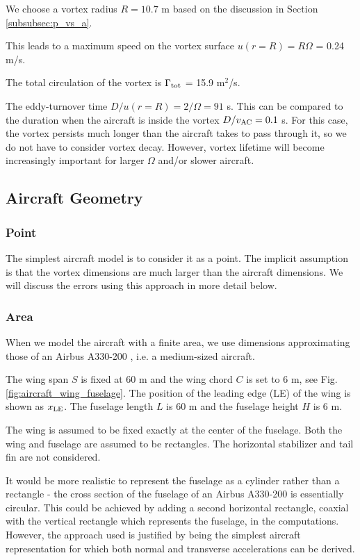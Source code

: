 \documentclass[smallextended]{svjour3}       %
\begin{document}
We choose a vortex radius $R = 10.7$ m based on the discussion in Section \ref{subsubsec:p_vs_a}.

This leads to a maximum speed on the vortex surface $u(r=R) = R \Omega$ = 0.24 m/s.

The total circulation of the vortex is $\Gamma_{\rm tot}$ = 15.9 m$^2$/s.

The eddy-turnover time $D/u(r=R)=2/\Omega= 91$ s. This can be compared to the duration when the aircraft is inside the vortex $D/v_{\rm AC} = 0.1 $ s. For this case, the vortex persists much longer than the aircraft takes to pass through it, so we do not have to consider vortex decay. However, vortex lifetime will become increasingly important for larger $\Omega$ and/or slower aircraft.

\subsection{Aircraft Geometry}

\subsubsection{Point}

The simplest aircraft model is to consider it as a point. The implicit assumption is that the vortex dimensions are much larger than the aircraft dimensions. We will discuss the errors using this approach in more detail below.

\subsubsection{Area}

When we model the aircraft with a finite area, we use dimensions approximating those of an Airbus A330-200 \citep{airbus_a}, i.e. a medium-sized aircraft.

The wing span $S$ is fixed at 60 m and the wing chord $C$ is set to 6 m, see Fig. \ref{fig:aircraft_wing_fuselage}. The position of the leading edge (LE) of the wing is shown as $x_{\rm LE}$. The fuselage length $L$ is 60 m and the fuselage height $H$ is 6 m.

The wing is assumed to be fixed exactly at the center of the fuselage. Both the wing and fuselage are assumed to be rectangles. The horizontal stabilizer and tail fin are not considered.

It would be more realistic to represent the fuselage as a cylinder rather than a rectangle - the cross section of the fuselage of an Airbus A330-200 is essentially circular. This could be achieved by adding a second horizontal rectangle, coaxial with the vertical rectangle which represents the fuselage, in the computations. However, the approach used is justified by being the simplest aircraft representation for which both normal and transverse accelerations can be derived.
\end{document}
